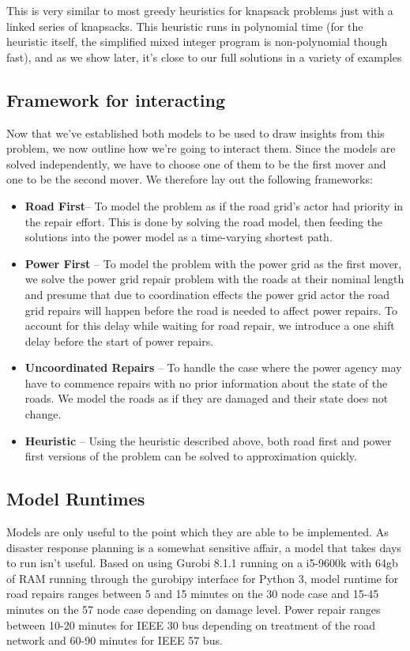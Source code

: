 \documentclass{article}
\begin{document}
	This is very similar to most greedy heuristics for knapsack problems just with a linked series of knapsacks. This heuristic runs in polynomial time (for the heuristic itself, the simplified mixed integer program is non-polynomial though fast), and as we show later, it's close to our full solutions in a variety of examples
	
	\subsection{Framework for interacting}
	Now that we've established both models to be used to draw insights from this problem, we now outline how we're going to interact them. Since the models are solved independently, we have to choose one of them to be the first mover and one to be the second mover. We therefore lay out the following frameworks:
	\begin{itemize}
		\item \textbf{Road First}-- To model the problem as if the road grid's actor had priority in the repair effort. This is done by solving the road model, then feeding the solutions into the power model as a time-varying shortest path.
		\item \textbf{Power First} -- To model the problem with the power grid as the first mover, we solve the power grid repair problem with the roads at their nominal length and presume that due to coordination effects the power grid actor the road grid repairs will happen before the road is needed to affect power repairs. To account for this delay while waiting for road repair, we introduce a one shift delay before the start of power repairs.
		\item \textbf{Uncoordinated Repairs} -- To handle the case where the power agency may have to commence repairs with no prior information about the state of the roads. We model the roads as if they are damaged and their state does not change.
		\item \textbf{Heuristic} -- Using the heuristic described above, both road first and power first versions of the problem can be solved to approximation quickly.
	\end{itemize}
	\subsection{Model Runtimes}
	Models are only useful to the point which they are able to be implemented. As disaster response planning is a somewhat sensitive affair, a model that takes days to run isn't useful. Based on using Gurobi 8.1.1 running on a i5-9600k with 64gb of RAM running through the gurobipy interface for Python 3, model runtime for road repairs ranges between 5 and 15 minutes on the 30 node case and 15-45 minutes on the 57 node case depending on damage level. Power repair ranges between 10-20 minutes for IEEE 30 bus depending on treatment of the road network and 60-90 minutes for IEEE 57 bus.
\end{document}
